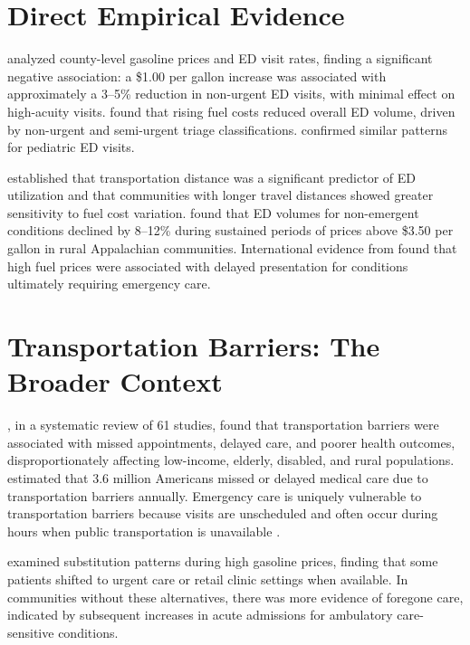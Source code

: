 \documentclass[12pt, a4paper]{article}
\begin{document}
\section{Direct Empirical Evidence}

\citet{wolfe2012} analyzed county-level gasoline prices and ED visit rates, finding a significant negative association: a \$1.00 per gallon increase was associated with approximately a 3--5\% reduction in non-urgent ED visits, with minimal effect on high-acuity visits. \citet{caldwell2013} found that rising fuel costs reduced overall ED volume, driven by non-urgent and semi-urgent triage classifications. \citet{murthy2014} confirmed similar patterns for pediatric ED visits.

\citet{hsia2012} established that transportation distance was a significant predictor of ED utilization and that communities with longer travel distances showed greater sensitivity to fuel cost variation. \citet{skinner2016} found that ED volumes for non-emergent conditions declined by 8--12\% during sustained periods of prices above \$3.50 per gallon in rural Appalachian communities. International evidence from \citet{bergstrand2015} found that high fuel prices were associated with delayed presentation for conditions ultimately requiring emergency care.

\section{Transportation Barriers: The Broader Context}

\citet{syed2013}, in a systematic review of 61 studies, found that transportation barriers were associated with missed appointments, delayed care, and poorer health outcomes, disproportionately affecting low-income, elderly, disabled, and rural populations. \citet{wallace2005} estimated that 3.6 million Americans missed or delayed medical care due to transportation barriers annually. Emergency care is uniquely vulnerable to transportation barriers because visits are unscheduled and often occur during hours when public transportation is unavailable \citep{hsiang2019}.

\citet{chou2019} examined substitution patterns during high gasoline prices, finding that some patients shifted to urgent care or retail clinic settings when available. In communities without these alternatives, there was more evidence of foregone care, indicated by subsequent increases in acute admissions for ambulatory care-sensitive conditions.
\end{document}

